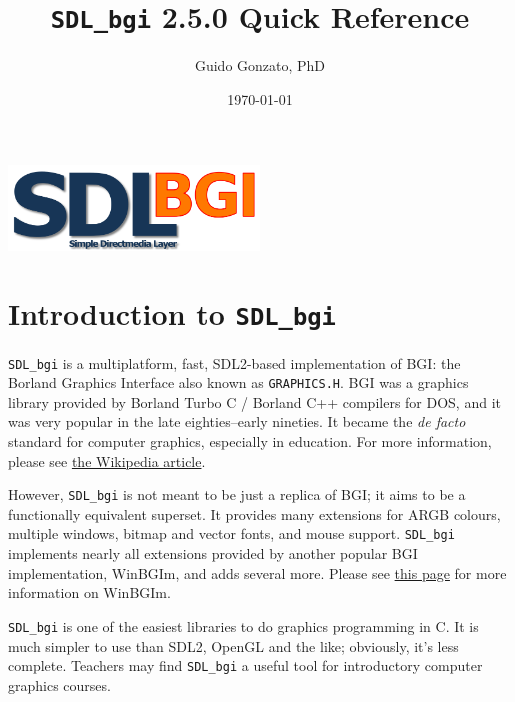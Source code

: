 \documentclass[a4paper,12pt]{article}
\newcommand{\version}{2.5.0}        %
\newcommand{\T}[1]{\texttt{#1}}     %
\newcommand{\SDLbgi}{\texttt{SDL\_bgi}}
\begin{document}
\title{\SDLbgi{} \version{} Quick Reference}

\author{Guido Gonzato, PhD}

\date{\today}

\maketitle

\begin{center}
  \includegraphics[width=0.5\textwidth]{SDL_bgi_logo.png}
\end{center}

{\small \tableofcontents}


\section{Introduction to \SDLbgi}

\SDLbgi{} is a multiplatform, fast, SDL2-based implementation of BGI:
the Borland Graphics Interface also known as \T{GRAPHICS.H}. BGI
was a graphics library provided by Borland Turbo C / Borland C++
compilers for DOS, and it was very popular in the late eighties--early
nineties. It became the \emph{de facto} standard for computer
graphics, especially in education. For more information, please see 
\href{https://en.wikipedia.org/wiki/Borland_Graphics_Interface}{the
Wikipedia article}.


However, \SDLbgi{} is not meant to be just a replica of BGI; it aims
to be a functionally equivalent superset. It provides many extensions
for ARGB colours, multiple windows, bitmap and vector fonts, and mouse
support. \SDLbgi{} implements nearly all extensions provided by
another popular BGI implementation, WinBGIm, and adds several more.
Please see \href{http://www.codecutter.net/tools/winbgim}{this page}
for more information on WinBGIm.

\SDLbgi{} is one of the easiest libraries to do graphics programming
in C. It is much simpler to use than SDL2, OpenGL and the like;
obviously, it's less complete. Teachers may find \SDLbgi{} a useful
tool for introductory computer graphics courses.
\end{document}
